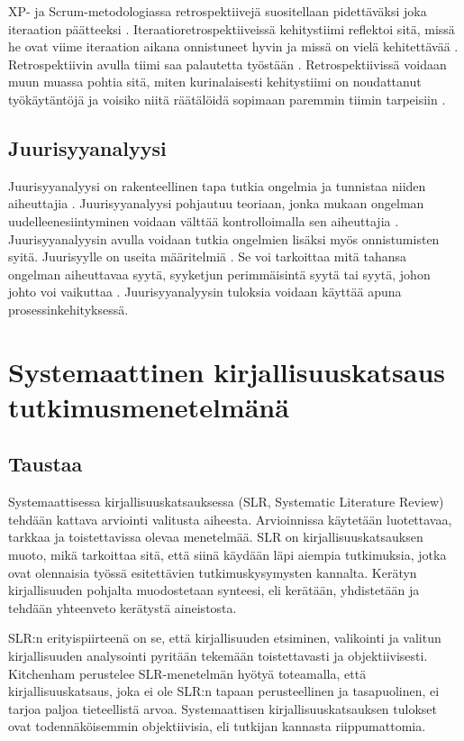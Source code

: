 XP- ja Scrum-metodologiassa retrospektiivejä suositellaan pidettäväksi joka iteraation päätteeksi \citep{Lindstrom2004, ScrumGuide2011}. Iteraatioretrospektiiveissä kehitystiimi reflektoi sitä, missä he ovat viime iteraation aikana onnistuneet hyvin ja missä on vielä kehitettävää \citep{Lindstrom2004, ScrumGuide2011}. Retrospektiivin avulla tiimi saa palautetta työstään \citep{Lindstrom2004}. Retrospektiivissä voidaan muun muassa pohtia sitä, miten kurinalaisesti kehitystiimi on noudattanut työkäytäntöjä ja voisiko niitä räätälöidä sopimaan paremmin tiimin tarpeisiin \citep{Lindstrom2004}.

\subsection{Juurisyyanalyysi}
Juurisyyanalyysi on rakenteellinen tapa tutkia ongelmia ja tunnistaa niiden aiheuttajia \citep{Lehtinen2011}. Juurisyyanalyysi pohjautuu teoriaan, jonka mukaan ongelman uudelleenesiintyminen voidaan välttää kontrolloimalla sen aiheuttajia \citep{Lehtinen2011}. Juurisyyanalyysin avulla voidaan tutkia ongelmien lisäksi myös onnistumisten syitä. \citep{Bjornson2009} Juurisyylle on useita määritelmiä \citep{Lehtinen2011}. Se voi tarkoittaa mitä tahansa ongelman aiheuttavaa syytä, syyketjun perimmäisintä syytä tai syytä, johon johto voi vaikuttaa \citep{Lehtinen2011}. Juurisyyanalyysin tuloksia voidaan käyttää apuna prosessinkehityksessä. \citep{Lehtinen2011}

\section{Systemaattinen kirjallisuuskatsaus tutkimusmenetelmänä}

\subsection{Taustaa}
Systemaattisessa kirjallisuuskatsauksessa (SLR, Systematic Literature Review) tehdään kattava arviointi valitusta aiheesta. Arvioinnissa käytetään luotettavaa, tarkkaa ja toistettavissa olevaa menetelmää. SLR on kirjallisuuskatsauksen muoto, mikä tarkoittaa sitä, että siinä käydään läpi aiempia tutkimuksia, jotka ovat olennaisia työssä esitettävien tutkimuskysymysten kannalta. Kerätyn kirjallisuuden pohjalta muodostetaan synteesi, eli kerätään, yhdistetään ja tehdään yhteenveto kerätystä aineistosta. \citep{Kitchenham2007}

SLR:n erityispiirteenä on se, että kirjallisuuden etsiminen, valikointi ja valitun kirjallisuuden analysointi pyritään tekemään toistettavasti ja objektiivisesti. Kitchenham perustelee SLR-menetelmän hyötyä toteamalla, että kirjallisuuskatsaus, joka ei ole SLR:n tapaan perusteellinen ja tasapuolinen, ei tarjoa paljoa tieteellistä arvoa. Systemaattisen kirjallisuuskatsauksen tulokset ovat todennäköisemmin objektiivisia, eli tutkijan kannasta riippumattomia. \citep{Kitchenham2007}

